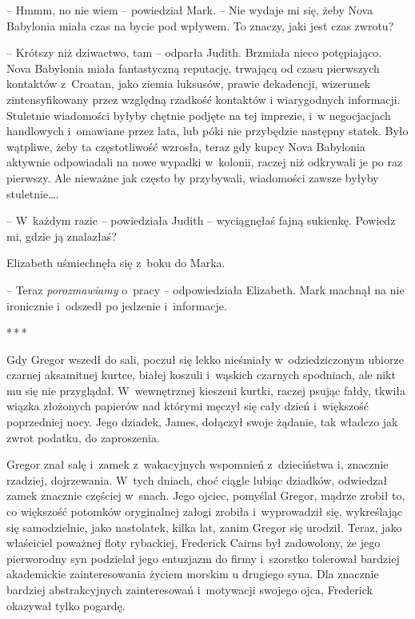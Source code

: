 \documentclass[oneside,polish,12pt,sfheadings]{mwbk}
\newcommand{\threeast}{\bigskip\par\centerline{*\,*\,*}\medskip\par}%
\begin{document}
-- Hmmm, no nie wiem -- powiedział Mark. -- Nie wydaje mi się, żeby Nova
Babylonia miała czas na bycie pod wpływem. To znaczy, jaki jest czas
zwrotu?

-- Krótszy niż dziwactwo, tam -- odparła Judith. Brzmiała nieco
potępiająco. Nova Babylonia miała fantastyczną reputację, trwającą od
czasu pierwszych kontaktów z~Croatan, jako ziemia luksusów, prawie
dekadencji, wizerunek zintensyfikowany przez względną rzadkość kontaktów
i wiarygodnych informacji. Stuletnie wiadomości byłyby chętnie podjęte
na tej imprezie, i~w negocjacjach handlowych i~omawiane przez lata, lub
póki nie przybędzie następny statek. Było wątpliwe, żeby ta
częstotliwość wzrosła, teraz gdy kupcy Nova Babylonia aktywnie
odpowiadali na nowe wypadki w~kolonii, raczej niż odkrywali je po raz
pierwszy. Ale nieważne jak często by przybywali, wiadomości zawsze
byłyby stuletnie\ldots.

-- W~każdym razie -- powiedziała Judith -- wyciągnęłaś fajną sukienkę.
Powiedz mi, gdzie ją znalazłaś?

Elizabeth uśmiechnęła się z~boku do Marka. 

-- Teraz \emph{porozmawiamy} o~pracy -- odpowiedziała Elizabeth. Mark machnął na nie ironicznie i~odszedł po jedzenie i~informacje.

\threeast

Gdy Gregor wszedł do sali, poczuł się lekko nieśmiały w~odziedziczonym
ubiorze czarnej aksamitnej kurtce, białej koszuli i~wąskich czarnych
spodniach, ale nikt mu się nie przyglądał. W~wewnętrznej kieszeni
kurtki, raczej psując fałdy, tkwiła wiązka złożonych papierów nad
którymi męczył się cały dzień i~większość poprzedniej nocy. Jego
dziadek, James, dołączył swoje żądanie, tak władczo jak zwrot podatku,
do zaproszenia.

Gregor znał salę i~zamek z~wakacyjnych wspomnień z~dzieciństwa i,
znacznie rzadziej, dojrzewania. W~tych dniach, choć ciągle lubiąc
dziadków, odwiedzał zamek znacznie częściej w~snach. Jego ojciec, pomyślał Gregor,
mądrze zrobił to, co większość potomków oryginalnej
załogi zrobiła i~wyprowadził się, wykreślając się samodzielnie, jako
nastolatek, kilka lat, zanim Gregor się urodził. Teraz, jako właściciel
poważnej floty rybackiej, Frederick Cairns był zadowolony, że jego
pierworodny syn podzielał jego entuzjazm do firmy i~szorstko tolerował
bardziej akademickie zainteresowania życiem morskim u drugiego syna. Dla
znacznie bardziej abstrakcyjnych zainteresowań i~motywacji swojego ojca,
Frederick okazywał tylko pogardę.
\end{document}
